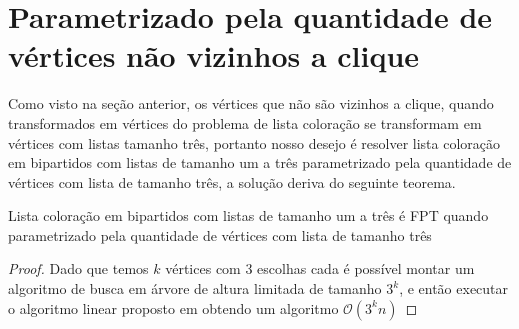 \section{Parametrizado pela quantidade de vértices não vizinhos a clique}
Como visto na seção anterior, os vértices que não são vizinhos a clique, quando transformados em vértices do problema de lista coloração se transformam em vértices com listas tamanho três, portanto nosso desejo é resolver lista coloração em bipartidos com listas de tamanho um a três parametrizado pela quantidade de vértices com lista de tamanho três, a solução deriva do seguinte teorema.

\begin{teorema}
 Lista coloração em bipartidos com listas de tamanho um a três é FPT quando parametrizado pela quantidade de vértices com lista de tamanho três
\end{teorema}
\begin{proof}
 Dado que temos $k$ vértices com 3 escolhas cada é possível montar um algoritmo de busca em árvore de altura limitada de tamanho $3^k$, e então executar o algoritmo linear proposto em \cite{hujter93} obtendo um algoritmo $\mathcal{O}(3^kn)$
 
\end{proof}
